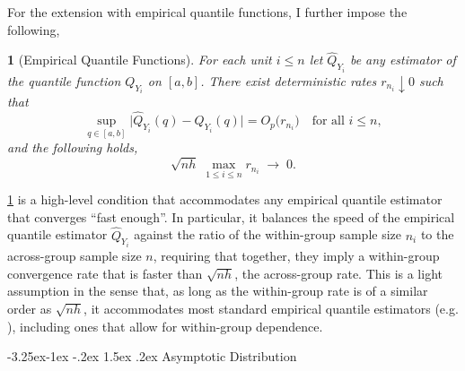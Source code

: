 \documentclass[12pt]{article}
\makeatletter
\renewcommand\subsection{\@startsection{subsection}{2}{\z@}%
  {-3.25ex\@plus -1ex \@minus -.2ex}%
  {1.5ex \@plus .2ex}%
  {\itshape\large\center}} %
\newtheorem{assumpE}{}
\makeatother
\begin{document}
For the extension with empirical quantile functions, I further impose the following,
\begin{assumpE}[Empirical Quantile Functions]\label{asspt:E_quantile}
 For each unit $i\le n$ let $\widehat{Q}_{Y_i}$ be any estimator of the quantile function $Q_{Y_i}$ on $[a,b]$. There exist deterministic rates $r_{n_i}\downarrow 0$ such that
\[
\sup_{q\in[a,b]}\bigl|\widehat{Q}_{Y_i}(q)-Q_{Y_i}(q)\bigr| = O_p\!\bigl(r_{n_i}\bigr)
\quad\text{for all }i\le n,
\]
and the following holds,
\[
\sqrt{nh}\;\max_{1\le i\le n} r_{n_i}\;\longrightarrow\;0.
\]
\end{assumpE}


\ref{asspt:E_quantile} is a high-level condition that accommodates any empirical quantile estimator that converges ``fast enough''. In particular, it balances the speed of the empirical quantile estimator $\hat{Q}_{Y_i}$ against the ratio of the within-group sample size $n_i$ to the across-group sample size $n$, requiring that together, they imply a within-group convergence rate that is faster than $\sqrt{nh}$, the across-group rate. This is a light assumption in the sense that, as long as the within-group rate is of a similar order as $\sqrt{nh}$, it accommodates most standard empirical quantile estimators (e.g. \citet[Corollary 21.5]{van2000asymptotic}), including ones that allow for within-group dependence. 




\subsection{Asymptotic Distribution}
\end{document}
